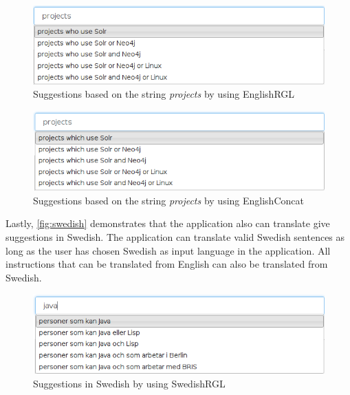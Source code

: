 \begin{figure}[H]
\includegraphics[scale=0.6,keepaspectratio,valign=t]{./gfx/projects-rgl.png}
\caption{Suggestions based on the string \emph{projects} by using EnglishRGL\label{fig:projects-rgl}}
\end{figure}

\begin{figure}[H]
\includegraphics[scale=0.6,keepaspectratio,valign=t]{./gfx/projects-concat.png}
\caption{Suggestions based on the string \emph{projects} by using EnglishConcat\label{fig:projects-concat}}
\end{figure}

Lastly, \autoref{fig:swedish} demonstrates that the application also can translate give suggestions in Swedish. The application can translate valid Swedish sentences as long as the user has chosen Swedish as input language in the application. All instructions that can be translated from English can also be translated from Swedish.

\begin{figure}[H]
\includegraphics[scale=0.6,keepaspectratio,valign=t]{./gfx/swedish.png}
\caption{Suggestions in Swedish by using SwedishRGL\label{fig:swedish}}
\end{figure}